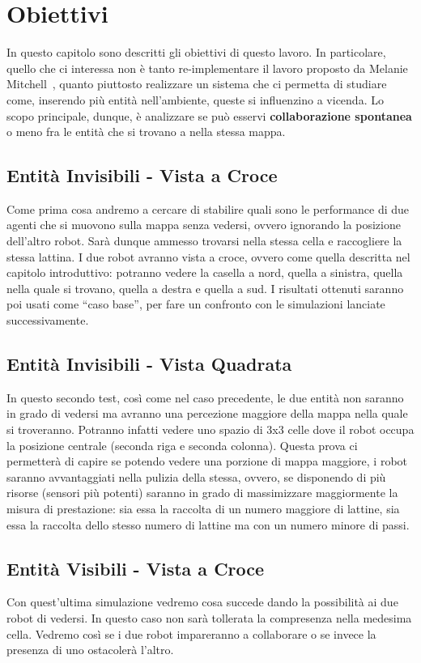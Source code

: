 \chapter{Obiettivi}
In questo capitolo sono descritti gli obiettivi di questo lavoro. In
particolare, quello che ci interessa non è tanto re-implementare il lavoro
proposto da Melanie Mitchell~\cite{biblio:robby}, quanto piuttosto realizzare un
sistema che ci permetta di studiare come, inserendo più entità nell'ambiente,
queste si influenzino a vicenda.\newline
Lo scopo principale, dunque, è analizzare se può esservi \textbf{collaborazione
spontanea} o meno fra le entità che si trovano a nella stessa mappa.

\section{Entità Invisibili - Vista a Croce}
Come prima cosa andremo a cercare di stabilire quali sono le performance di due
agenti che si muovono sulla mappa senza vedersi, ovvero ignorando la posizione
dell'altro robot. Sarà dunque ammesso trovarsi nella stessa cella e raccogliere
la stessa lattina.\newline
I due robot avranno vista a croce, ovvero come quella descritta nel capitolo
introduttivo: potranno vedere la casella a nord, quella a sinistra, quella nella
quale si trovano, quella a destra e quella a sud.\newline
I risultati ottenuti saranno poi usati come ``caso base'', per fare un confronto
con le simulazioni lanciate successivamente.

\section{Entità Invisibili - Vista Quadrata}
In questo secondo test, così come nel caso precedente, le due entità non saranno
in grado di vedersi ma avranno una percezione maggiore della mappa nella quale
si troveranno. Potranno infatti vedere uno spazio di 3x3 celle dove il robot
occupa la posizione centrale (seconda riga e seconda colonna).\newline
Questa prova ci permetterà di capire se potendo vedere una porzione di mappa
maggiore, i robot saranno avvantaggiati nella pulizia della stessa, ovvero, se
disponendo di più risorse (sensori più potenti) saranno in grado di massimizzare
maggiormente la misura di prestazione: sia essa la raccolta di un numero
maggiore di lattine, sia essa la raccolta dello stesso numero di lattine ma con
un numero minore di passi.

\section{Entità Visibili - Vista a Croce}
Con quest'ultima simulazione vedremo cosa succede dando la possibilità ai due
robot di vedersi. In questo caso non sarà tollerata la compresenza nella
medesima cella.\newline
Vedremo così se i due robot impareranno a collaborare o se invece la presenza
di uno ostacolerà l'altro.
